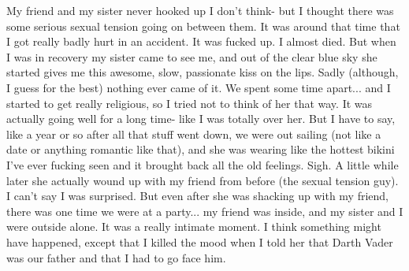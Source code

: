 \documentclass[a4paper]{article}
\begin{document}
My friend and my sister never hooked up I don't think- but I thought there was some serious sexual tension going on between them. It was around that time that I got really badly hurt in an accident. It was fucked up. I almost died. But when I was in recovery my sister came to see me, and out of the clear blue sky she started gives me this awesome, slow, passionate kiss on the lips.
Sadly (although, I guess for the best) nothing ever came of it. We spent some time apart... and I started to get really religious, so I tried not to think of her that way. It was actually going well for a long time- like I was totally over her. But I have to say, like a year or so after all that stuff went down, we were out sailing (not like a date or anything romantic like that), and she was wearing like the hottest bikini I've ever fucking seen and it brought back all the old feelings. Sigh.
A little while later she actually wound up with my friend from before (the sexual tension guy). I can't say I was surprised.
But even after she was shacking up with my friend, there was one time we were at a party... my friend was inside, and my sister and I were outside alone. It was a really intimate moment. I think something might have happened, except that I killed the mood when I told her that Darth Vader was our father and that I had to go face him.
\end{document}
